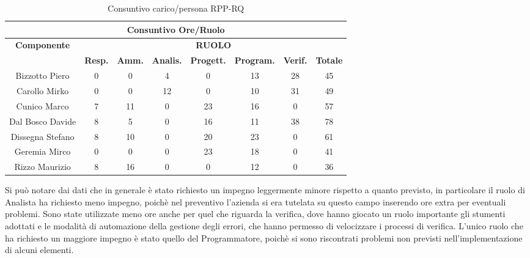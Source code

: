 \begin{table}[!h]
	\begin{center}
		  \begin{tabular}
			  {|c|c|c|c|c|c|c|c|}
		 \hline
			\multicolumn{8}{|c|}{ \textbf{Consuntivo Ore/Ruolo} } \\
			\hline
			\textbf{Componente} & \multicolumn{7}{|c|}{ \textbf{RUOLO} } \\
			\hline
			& \textbf{Resp.} & \textbf{Amm.} & \textbf{Analis.} & \textbf{Progett.} & \textbf{Program.} & \textbf{Verif.}  & \textbf{Totale}\\
			\hline
			Bizzotto Piero 		&  0  &  0  &  4  &  0  &  13 &  28 &  45 \\ %
			\hline
			Carollo Mirko 		&  0  &  0  &  12 &  0  &  10 &  31 &  49\\ %
			\hline
			Cunico Marco    	&  7  &  11 &  0  &  23 &  16 &  0  &  57\\ %
			\hline
			Dal Bosco Davide   	&  8  &  5  &  0  &  16 &  11 &  38 &  78\\ %
			\hline
			Dissegna Stefano    &  8  &  10 &  0  &  20 &  23 &  0  &  61\\ %
			\hline
			Geremia Mirco   	&  0  &  0  &  0  &  23 &  18 &  0  &  41\\ %
			\hline	
			Rizzo Maurizio  	&  8  &  16 &  0  &  0  &  12 &  0  &  36\\ %
			\hline	
		\end{tabular}
	\caption{Consuntivo carico/persona RPP-RQ} %
	\label{tab: ConsPersOre_RPP-RQ}
	\end{center}	
\end{table}

Si pu\`o notare dai dati che in generale \`e stato richiesto un impegno leggermente minore rispetto a quanto previsto, in particolare il ruolo di Analista ha richiesto meno impegno, poich\`e nel preventivo l'azienda si era tutelata su questo campo inserendo ore extra per eventuali problemi. Sono state utilizzate meno ore anche per quel che riguarda la verifica, dove hanno giocato un ruolo importante gli stumenti adottati e le modalit\`a di automazione della gestione degli errori, che hanno permesso di velocizzare i processi di verifica. L'unico ruolo che ha richiesto un maggiore impegno \`e stato quello del Programmatore, poich\`e si sono riscontrati problemi non previsti nell'implementazione di alcuni elementi.

